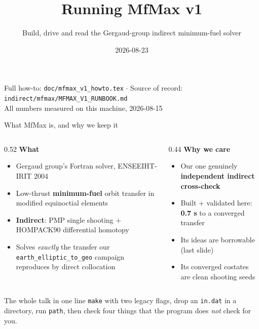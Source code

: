 \documentclass[10pt,aspectratio=169]{beamer}
\title{\bfseries Running MfMax v1}
\subtitle{Build, drive and read the Gergaud-group indirect minimum-fuel solver}
\author{\file{earth\_elliptic\_to\_geo/indirect/mfmax}}
\date{2026-08-23}
\newcommand{\code}[1]{\texttt{\small #1}}
\newcommand{\file}[1]{\texttt{\small #1}}
\begin{document}
\begin{frame}
\titlepage
\begin{center}\small
Full how-to: \file{doc/mfmax\_v1\_howto.tex} \quad$\cdot$\quad
Source of record: \file{indirect/mfmax/MFMAX\_V1\_RUNBOOK.md}\\[2pt]
All numbers measured on this machine, 2026-08-15
\end{center}
\end{frame}

\begin{frame}{What MfMax is, and why we keep it}

\begin{columns}[T]
\begin{column}{0.52\textwidth}
\textbf{What}
\begin{itemize}
\item Gergaud group's Fortran solver, ENSEEIHT-IRIT 2004
\item Low-thrust \textbf{minimum-fuel} orbit transfer in modified equinoctial
      elements
\item \textbf{Indirect}: PMP single shooting $+$ HOMPACK90 differential
      homotopy
\item Solves \emph{exactly} the transfer our
      \file{earth\_elliptic\_to\_geo} campaign reproduces by direct
      collocation
\end{itemize}
\end{column}
\begin{column}{0.44\textwidth}
\textbf{Why we care}
\begin{itemize}
\item Our one genuinely \textbf{independent indirect cross-check}
\item Built + validated here: \textbf{0.7 s} to a converged transfer
\item Its ideas are borrowable (last slide)
\item Its converged costates are clean shooting seeds
\end{itemize}
\end{column}
\end{columns}

\vspace{4pt}
\begin{block}{The whole talk in one line}
\code{make} with two legacy flags, drop an \file{in.dat} in a directory, run
\code{path}, then check four things that the program does \emph{not} check for
you.
\end{block}
\end{frame}
\end{document}
